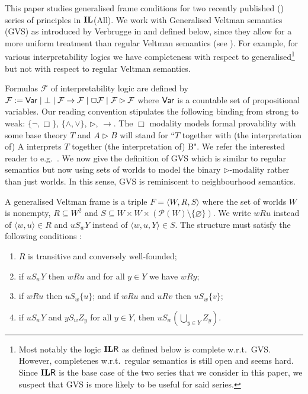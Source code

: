 \documentclass[twoside]{aiml20}
\newcommand{\intl}[1]{{\ensuremath {\textup{\textbf{IL}}}({\rm #1})}}
\newcommand{\ilr}{\extil{R}}
\newcommand{\ilal}{\intl{All}\xspace}
\newcommand{\extil}[1]{\ensuremath{\textup{\textbf{IL}}{\sf\ensuremath{#1}}}\xspace}
\begin{document}
This paper studies generalised frame conditions for two recently published (\cite{two-new-series}) series of principles in \ilal. We work with Generalised Veltman semantics (GVS) as introduced by Verbrugge in \cite{Verbrugge} and defined below, since they allow for a more uniform treatment than regular Veltman semantics (see \cite{Mikec-Vukovic-20}). For example, for various interpretability logics we have completeness with respect to generalised\footnote{Most notably the logic \ilr as defined below is complete w.r.t.~GVS. However, completenes w.r.t.~regular semantics is still open and seems hard. Since \ilr is the base case of the two series that we consider in this paper, we suspect that GVS is more likely to be useful for said series.} but not with respect to regular Veltman semantics. 

Formulas $\mathcal F$ of interpretability logic are defined by $\mathcal F := {\sf Var} \mid \bot \mid \mathcal F \to \mathcal F \mid \Box \mathcal F \mid \mathcal F \rhd \mathcal F$ where $\sf Var$ is a countable set of propositional variables. Our reading convention stipulates the following binding from strong to weak: $\{ \neg, \Box \}$, $\{ \wedge, \vee \}$, $\rhd$, $\to$. The $\Box$ modality models formal provability with some base theory $T$ and $A\rhd B$ will stand for ``$T$ together with (the interpretation of) A interprets $T$ together (the interpretation of) B". We refer the interested reader to e.g.~\cite{JaparidzeJongh:1998:HandbookPaper}. We now give the definition of GVS which is similar to regular semantics but now using sets of worlds to model the binary $\rhd$-modality rather than just worlds. In this sense, GVS is reminiscent to neighbourhood semantics.
\begin{definition}  A generalised Veltman frame is a triple
\(F=\langle W,R,S\rangle \) where the set of worlds \(W\) is nonempty, \(R\subseteq W^2\) and \(S\subseteq W\times W\times (\mathcal{P}(W)\setminus \{\varnothing\} )\). We write \(wRu\)
instead of \(\langle w,u\rangle \in R\) and \(uS_wY\) instead of \(\langle w,u,Y\rangle \in S\). The structure must
satisfy the following conditions :
\begin{enumerate}[nosep]
\item \(R\) is transitive and conversely well-founded;
\item if \(uS_wY\) then \(wRu\) and for all \(y\in Y\) we have \(wRy\);
\item if \(wRu\) then \(uS_w\{u\}\); and if \(wRu\) and \(uRv\) then \(uS_w\{v\}\);
\item if \(uS_wY\) and \(yS_wZ_y\) for all \(y\in Y\), then \(uS_w\left(\bigcup _{y\in Y}Z_y\right)\).
\end{enumerate}
\end{definition}
\end{document}
